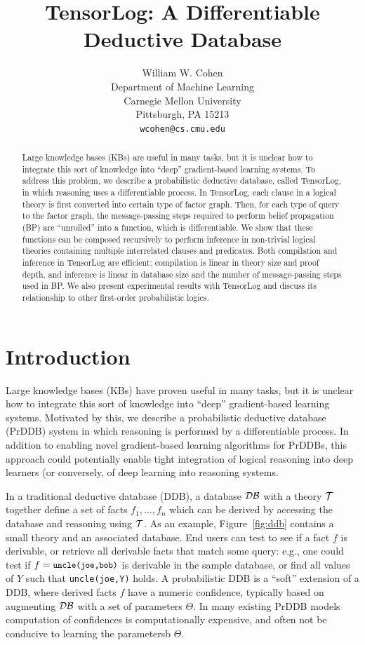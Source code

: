 \documentclass{article}
\title{TensorLog: A Differentiable Deductive Database}
\author{
  William W. Cohen\\
  Department of Machine Learning\\
  Carnegie Mellon University\\
  Pittsburgh, PA 15213 \\
  \texttt{wcohen@cs.cmu.edu} \\
}
\newcommand{\cd}[1]{{\small \texttt{#1}}}
\newcommand{\T}{{\cal{T}}}
\newcommand{\DB}{{\cal{DB}}}
\begin{document}

\maketitle

\begin{abstract}
Large knowledge bases (KBs) are useful in many tasks, but it is
unclear how to integrate this sort of knowledge into ``deep''
gradient-based learning systems.  To address this problem, we describe
a probabilistic deductive database, called TensorLog, in which
reasoning uses a differentiable process.  In TensorLog, each clause in
a logical theory is first converted into certain type of factor graph.
Then, for each type of query to the factor graph, the message-passing
steps required to perform belief propagation (BP) are ``unrolled''
into a function, which is differentiable.  We show that these
functions can be composed recursively to perform inference in
non-trivial logical theories containing multiple interrelated clauses
and predicates.  Both compilation and inference in TensorLog are
efficient: compilation is linear in theory size and proof depth, and
inference is linear in database size and the number of message-passing
steps used in BP.  We also present experimental results with TensorLog
and discuss its relationship to other first-order probabilistic
logics.
\end{abstract}

\section{Introduction}

Large knowledge bases (KBs) have proven useful in many tasks, but it
is unclear how to integrate this sort of knowledge into ``deep''
gradient-based learning systems.  Motivated by this, we describe a
probabilistic deductive database (PrDDB) system in which reasoning is
performed by a differentiable process.  In addition to enabling novel
gradient-based learning algorithms for PrDDBs, this approach could
potentially enable tight integration of logical reasoning into deep
learners (or conversely, of deep learning into reasoning systems.

In a traditional deductive database (DDB), a database $\DB$ with a
theory $\T$ together define a set of facts $f_1,\ldots,f_n$ which can
be derived by accessing the database and reasoning using $\T$.  As an
example, Figure~\ref{fig:ddb} contains a small theory and an
associated database.  End users can test to see if a fact $f$ is
derivable, or retrieve all derivable facts that match some query:
e.g., one could test if $f=\cd{uncle(joe,bob)}$ is derivable in the
sample database, or find all values of $Y$ such that \cd{uncle(joe,Y)}
holds.  A probabilistic DDB is a ``soft'' extension of a DDB, where
derived facts $f$ have a numeric confidence, typically based on
augmenting $\DB$ with a set of parameters $\Theta$.  In many existing
PrDDB models computation of confidences is computationally expensive,
and often not be conducive to learning the parametersb $\Theta$.
\end{document}
